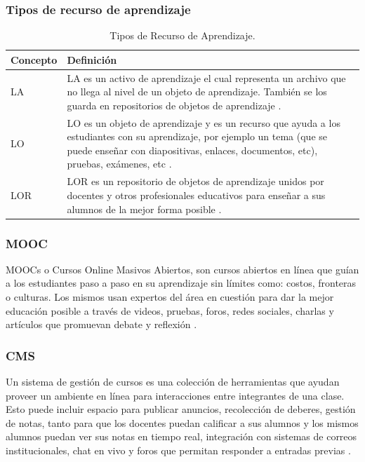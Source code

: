 \subsubsection{Tipos de recurso de aprendizaje}
\begin{table}[h!]
	\small
    \begin{tabular}{|p{}|p{}|}
        \hline
        Concepto & Definición \\
        \hline
        LA & LA es un activo de aprendizaje el cual representa un archivo que no llega al nivel de un objeto de aprendizaje. También se los guarda en repositorios de objetos de aprendizaje \citep{GOVIEW-LOR}. \\
        \hline
        LO & LO es un objeto de aprendizaje y es un recurso que ayuda a los estudiantes con su aprendizaje, por ejemplo un tema (que se puede enseñar con diapositivas, enlaces, documentos, etc), pruebas, exámenes, etc \citep{GOVIEW-LOR}. \\
        \hline
        LOR & LOR es un repositorio de objetos de aprendizaje unidos por docentes y otros profesionales educativos para enseñar a sus alumnos de la mejor forma posible \citep{GOVIEW-LOR}. \\
        \hline
    \end{tabular}
	\caption{Tipos de Recurso de Aprendizaje.}
    \label{tipos-recurso-aprendizaje}
\end{table}

\subsubsection{MOOC}
MOOCs o Cursos Online Masivos Abiertos, son cursos abiertos en línea que guían a los estudiantes paso a paso en su aprendizaje sin límites como: costos, fronteras o culturas. Los mismos usan expertos del área en cuestión para dar la mejor educación posible a través de videos, pruebas, foros, redes sociales, charlas y artículos que promuevan debate y reflexión \citep{UEA-What-is-a-MOOC}.

\subsubsection{CMS}
Un sistema de gestión de cursos es una colección de herramientas que ayudan proveer un ambiente en línea para interacciones entre integrantes de una clase. Esto puede incluir espacio para publicar anuncios, recolección de deberes, gestión de notas, tanto para que los docentes puedan calificar a sus alumnos y los mismos alumnos puedan ver sus notas en tiempo real, integración con sistemas de correos institucionales, chat en vivo y foros que permitan responder a entradas previas  \citep{Vanderbilt-Course-Management-Systems}.

